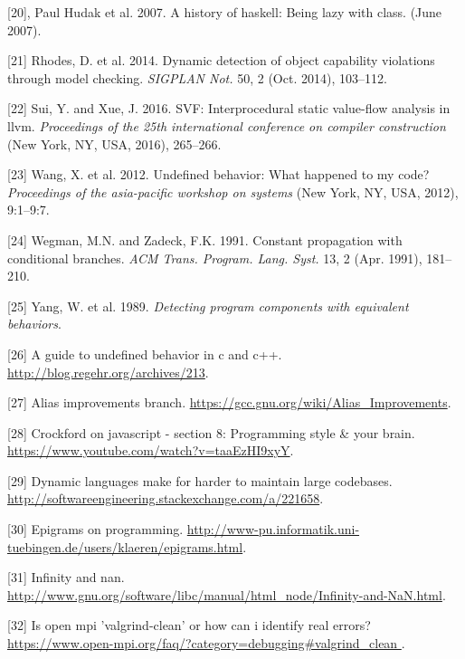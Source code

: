 \documentclass[]{article}
\begin{document}
\hypertarget{ref-haskell}{}
{[}20{]}, Paul Hudak et al. 2007. A history of haskell: Being lazy with
class. (June 2007).

\hypertarget{ref-symb1}{}
{[}21{]} Rhodes, D. et al. 2014. Dynamic detection of object capability
violations through model checking. \emph{SIGPLAN Not.} 50, 2 (Oct.
2014), 103--112.

\hypertarget{ref-svf}{}
{[}22{]} Sui, Y. and Xue, J. 2016. SVF: Interprocedural static
value-flow analysis in llvm. \emph{Proceedings of the 25th international
conference on compiler construction} (New York, NY, USA, 2016),
265--266.

\hypertarget{ref-wang}{}
{[}23{]} Wang, X. et al. 2012. Undefined behavior: What happened to my
code? \emph{Proceedings of the asia-pacific workshop on systems} (New
York, NY, USA, 2012), 9:1--9:7.

\hypertarget{ref-constant}{}
{[}24{]} Wegman, M.N. and Zadeck, F.K. 1991. Constant propagation with
conditional branches. \emph{ACM Trans. Program. Lang. Syst.} 13, 2 (Apr.
1991), 181--210.

\hypertarget{ref-equivalent}{}
{[}25{]} Yang, W. et al. 1989. \emph{Detecting program components with
equivalent behaviors}.

\hypertarget{ref-guide}{}
{[}26{]} A guide to undefined behavior in c and c++.
\url{http://blog.regehr.org/archives/213}.

\hypertarget{ref-oracle}{}
{[}27{]} Alias improvements branch.
\url{https://gcc.gnu.org/wiki/Alias_Improvements}.

\hypertarget{ref-crockford}{}
{[}28{]} Crockford on javascript - section 8: Programming style \& your
brain. \url{https://www.youtube.com/watch?v=taaEzHI9xyY}.

\hypertarget{ref-lippert}{}
{[}29{]} Dynamic languages make for harder to maintain large codebases.
\url{http://softwareengineering.stackexchange.com/a/221658}.

\hypertarget{ref-tarpit}{}
{[}30{]} Epigrams on programming.
\url{http://www-pu.informatik.uni-tuebingen.de/users/klaeren/epigrams.html}.

\hypertarget{ref-gnu}{}
{[}31{]} Infinity and nan.
\url{http://www.gnu.org/software/libc/manual/html_node/Infinity-and-NaN.html}.

\hypertarget{ref-mpi}{}
{[}32{]} Is open mpi 'valgrind-clean' or how can i identify real errors?
\href{https://www.open-mpi.org/faq/?category=debugging\#valgrind_clean\%0A}{https://www.open-mpi.org/faq/?category=debugging\#valgrind\_clean
}.
\end{document}
